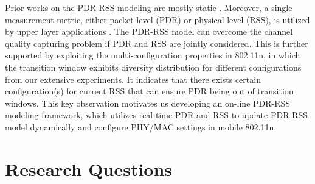 \documentclass[draftclsnofoot,journal,onecolumn,11pt]{IEEEtran}
\begin{document}
Prior works on the PDR-RSS modeling are mostly static \cite{kashyap2007capacity} \cite{kolar2011mesh} \cite{reis2006model}. Moreover, a single measurement metric, either packet-level (PDR) or physical-level (RSS), is utilized by upper layer applications\cite{judd2008efficient} \cite{zhang2008practical}. The PDR-RSS model can overcome the channel quality capturing problem if PDR and RSS are jointly considered. This is further supported by exploiting the multi-configuration properties in 802.11n, in which the transition window exhibits diversity distribution for different configurations from our extensive experiments. It indicates that there exists certain configuration(s) for current RSS that can ensure PDR being out of transition windows. This key observation motivates us developing an on-line PDR-RSS modeling framework, which utilizes real-time PDR and RSS to update PDR-RSS model dynamically and configure PHY/MAC settings in mobile 802.11n.
%
%
%
%
%
%

\section{Research Questions}
\end{document}

